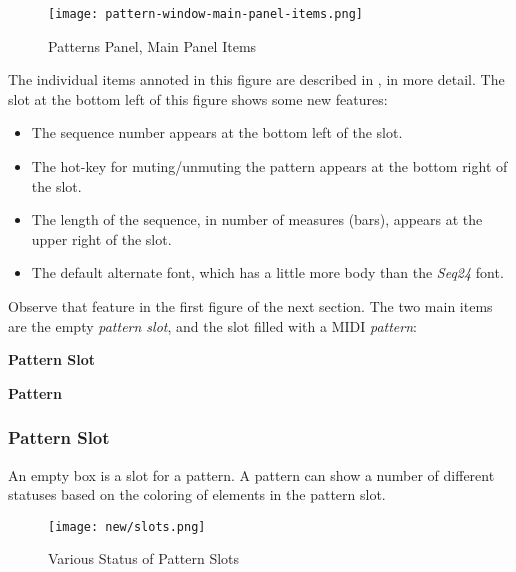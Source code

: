 \begin{figure}[H]
   \centering 
   \texttt{[image: pattern-window-main-panel-items.png]}
   \caption{Patterns Panel, Main Panel Items}
   \label{fig:pattern_window_main_panel_items}
\end{figure}

   The individual items annoted in this figure are described in
   , in more detail.
   The slot at the bottom left of this figure shows some new features:

   \begin{itemize}
      \item The sequence number appears at the bottom left of the slot.
      \item The hot-key for muting/unmuting the pattern appears at the bottom
         right of the slot.
      \item The length of the sequence, in number of measures (bars), appears
         at the upper right of the slot.
      \item The default alternate font, which has a little more body than the
         \textsl{Seq24} font.
   \end{itemize}

   Observe that feature in the first figure of the next section.
   The two main items are the empty \textsl{pattern slot}, and the slot filled
   with a MIDI \textsl{pattern}:

   \begin{enumber}
      \item \textbf{Pattern Slot}
      \item \textbf{Pattern}
   \end{enumber}

\subsubsection{Pattern Slot}
\label{subsubsec:seq64_patterns_pattern_slot}

   An empty box is a slot for a pattern.
   A pattern can show a number of different statuses based on the coloring
   of elements in the pattern slot. 

\begin{figure}[H]
   \centering 
   \texttt{[image: new/slots.png]}
   \caption{Various Status of Pattern Slots}
   \label{fig:pattern_slots_statuses}
\end{figure}

